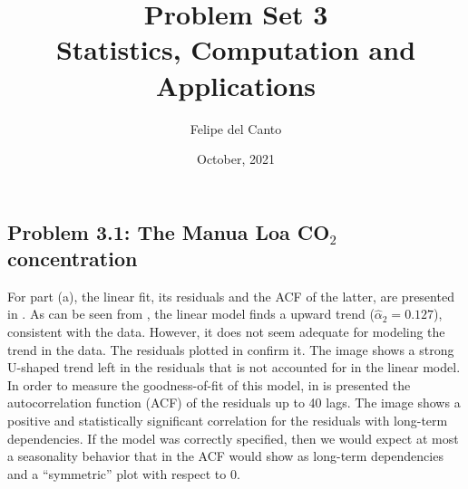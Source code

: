 \documentclass[11pt, english]{article}
\title{\bf Problem Set 3 \\ Statistics, Computation and
Applications\\[-1ex]}
\author{Felipe del Canto}
\date{October, 2021}
\begin{document}
    
\maketitle
   
\begin{multicols}{2}

\section*{Problem 3.1: The Manua Loa CO$_{2}$\\ concentration}

For part (a), the linear fit, its residuals and the ACF of the latter, are presented in . As can be seen from , the linear model finds a upward trend ($\hat{\alpha}_{2} = 0.127$), consistent with the data. However, it does not seem adequate for modeling the trend in the data. The residuals plotted in  confirm it. The image shows a strong U-shaped trend left in the residuals that is not accounted for in the linear model. In order to measure the goodness-of-fit of this model, in  is presented the autocorrelation function (ACF) of the residuals up to 40 lags. The image shows a positive and statistically significant correlation for the residuals with long-term dependencies. If the model was correctly specified, then we would expect at most a seasonality behavior that in the ACF would show as long-term dependencies and a ``symmetric'' plot with respect to 0.


\end{multicols}
\end{document}
